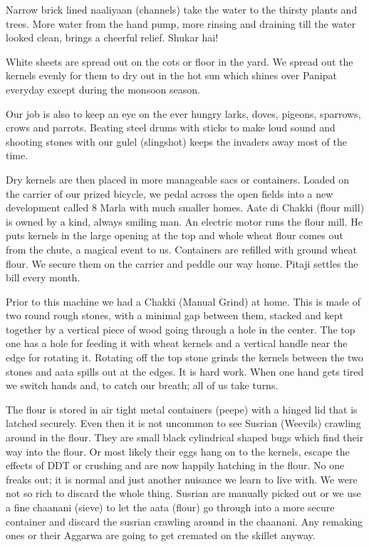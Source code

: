 Narrow brick lined naaliyaan (channels) take the water to the thirsty
plants and trees. More water from the hand pump, more rinsing and draining
till the water looked clean, brings a cheerful relief. Shukar hai! 

White sheets are spread out on the cots or floor in the yard. We spread
out the kernels evenly for them to dry out in the hot sun which shines
over Panipat everyday except during the monsoon season. 

Our job is also to keep an eye on the ever hungry larks, doves, pigeons,
sparrows, crows and parrots. Beating steel drums with sticks to make loud
sound and shooting stones with our gulel (slingshot) keeps the invaders
away most of the time. 

Dry kernels are then placed in more manageable sacs or containers. Loaded
on the carrier of our prized bicycle, we pedal across the open fields into
a new development called 8 Marla with much smaller homes. Aate di Chakki
(flour mill) is owned by a kind, always smiling man. An electric motor
runs the flour mill. He puts kernels in the large opening at the top and
whole wheat flour comes out from the chute, a magical event to us.
Containers are refilled with ground wheat flour. We secure them on the
carrier and peddle our way home. Pitaji settles the bill every month. 

Prior to this machine we had a Chakki (Manual Grind) at home. This is made
of two round rough stones, with a minimal gap between them, stacked and
kept together by a vertical piece of wood going through a hole in the
center. The top one has a hole for feeding it with wheat kernels and
a vertical handle near the edge for rotating it. Rotating off the top
stone grinds the kernels between the two stones and aata spills out at the
edges. It is hard work. When one hand gets tired we switch hands and, to
catch our breath; all of us take turns. 

The flour is stored in air tight metal containers (peepe) with a hinged
lid that is latched securely. Even then it is not uncommon to see Susrian
(Weevils) crawling around in the flour. They are small black cylindrical
shaped bugs which find their way into the flour. Or most likely their eggs
hang on to the kernels, escape the effects of DDT or crushing and are now
happily hatching in the flour. No one freaks out; it is normal and just
another nuisance we learn to live with. We were not so rich to discard the
whole thing. Susrian are manually picked out or we use a fine chaanani
(sieve) to let the aata (flour) go through into a more secure container
and discard the susrian crawling around in the chaanani. Any remaking ones
or their Aggarwa are going to get cremated on the skillet anyway. 

